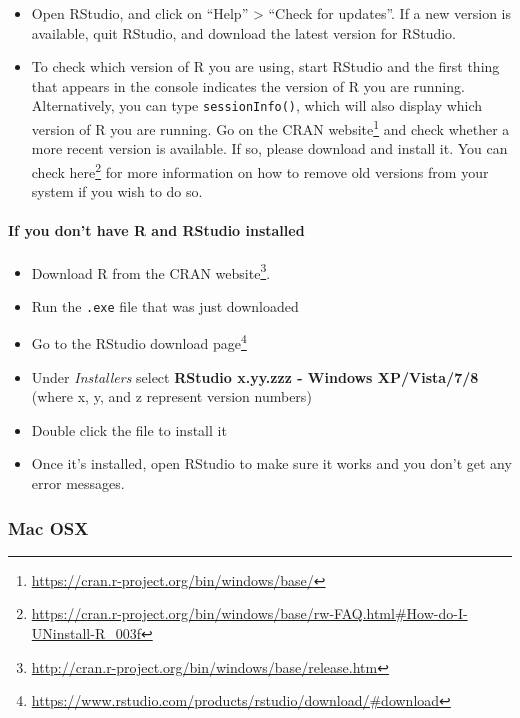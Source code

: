 \documentclass[
  12pt,
]{book}
\newcommand{\passthrough}[1]{#1}
\providecommand{\tightlist}{%
  \setlength{\itemsep}{0pt}\setlength{\parskip}{0pt}}
\renewcommand{\href}[2]{#2\footnote{\url{#1}}}
\theoremstyle{definition}
\theoremstyle{definition}
\theoremstyle{definition}
\newcommand{\1}{\mathbbm{1}}
\begin{document}
\begin{itemize}
\tightlist
\item
  Open RStudio, and click on ``Help'' \textgreater{} ``Check for updates''. If a new version is
  available, quit RStudio, and download the latest version for RStudio.
\item
  To check which version of R you are using, start RStudio and the first thing
  that appears in the console indicates the version of R you are
  running. Alternatively, you can type \passthrough{\lstinline!sessionInfo()!}, which will also display
  which version of R you are running. Go on the \href{https://cran.r-project.org/bin/windows/base/}{CRAN
  website} and check whether a
  more recent version is available. If so, please download and install it. You
  can \href{https://cran.r-project.org/bin/windows/base/rw-FAQ.html\#How-do-I-UNinstall-R_003f}{check here}
  for more information on how to remove old versions from your system if you
  wish to do so.
\end{itemize}

\hypertarget{if-you-dont-have-r-and-rstudio-installed}{%
\paragraph{If you don't have R and RStudio installed}\label{if-you-dont-have-r-and-rstudio-installed}}

\begin{itemize}
\tightlist
\item
  Download R from
  the \href{http://cran.r-project.org/bin/windows/base/release.htm}{CRAN website}.
\item
  Run the \passthrough{\lstinline!.exe!} file that was just downloaded
\item
  Go to the \href{https://www.rstudio.com/products/rstudio/download/\#download}{RStudio download
  page}
\item
  Under \emph{Installers} select \textbf{RStudio x.yy.zzz - Windows
  XP/Vista/7/8} (where x, y, and z represent version numbers)
\item
  Double click the file to install it
\item
  Once it's installed, open RStudio to make sure it works and you don't get any
  error messages.
\end{itemize}

\hypertarget{mac-osx}{%
\subsubsection{Mac OSX}\label{mac-osx}}
\end{document}

